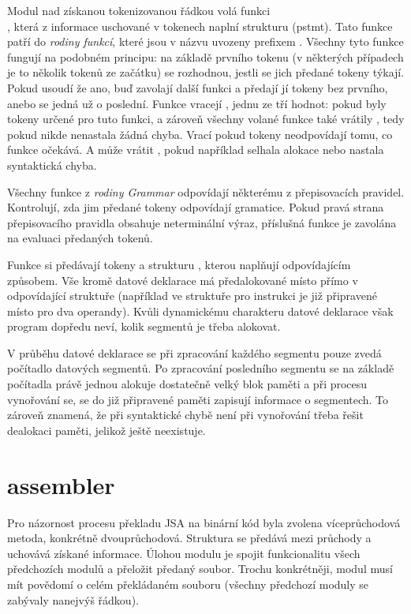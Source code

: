 \documentclass[czech, kiv, he, sem, pdf, viewonly]{fasthesis}
\begin{document}
Modul  nad získanou tokenizovanou řádkou volá funkci
\\, která z informace uschované v tokenech
naplní strukturu  (pstmt). Tato funkce patří do
\textit{rodiny funkcí}, které jsou v názvu uvozeny prefixem .
Všechny tyto funkce fungují na podobném principu: na základě prvního tokenu (v
některých případech je to několik tokenů ze začátku) se rozhodnou, jestli se
jich předané tokeny týkají. Pokud usoudí že ano, buď zavolají další funkci a
předají jí tokeny bez prvního, anebo se jedná už o poslední. Funkce vracejí
, jednu ze tří hodnot:  pokud byly tokeny
určené pro tuto funkci, a zároveň všechny volané funkce také vrátily
, tedy pokud nikde nenastala žádná chyba. Vrací
 pokud tokeny neodpovídají tomu, co funkce očekává. A může
vrátit , pokud například selhala alokace nebo nastala syntaktická
chyba.

Všechny funkce z \textit{rodiny Grammar} odpovídají některému z přepisovacích
pravidel. Kontrolují, zda jim předané tokeny odpovídají gramatice. Pokud pravá
strana přepisovacího pravidla obsahuje neterminální výraz, příslušná funkce je
zavolána na evaluaci předaných tokenů.

Funkce si předávají tokeny a strukturu , kterou
naplňují odpovídajícím způsobem. Vše kromě datové deklarace má předalokované
místo přímo v odpovídající struktuře (například ve struktuře pro instrukci je
již připravené místo pro dva operandy). Kvůli dynamickému charakteru datové
deklarace však program dopředu neví, kolik segmentů je třeba alokovat.

V průběhu datové deklarace se při zpracování každého segmentu pouze zvedá
počítadlo datových segmentů. Po zpracování posledního segmentu se na základě
počítadla právě jednou alokuje dostatečně velký blok paměti a při procesu
vynořování se, se do již připravené paměti zapisují informace o segmentech. To
zároveň znamená, že při syntaktické chybě není při vynořování třeba řešit
dealokaci paměti, jelikož ještě neexistuje.

\section{assembler}

Pro názornost procesu překladu JSA na binární kód byla zvolena víceprůchodová
metoda, konkrétně dvouprůchodová. Struktura  se
předává mezi průchody a uchovává získané informace. Úlohou modulu
 je spojit funkcionalitu všech předchozích modulů a přeložit
předaný soubor. Trochu konkrétněji, modul musí mít povědomí o celém překládaném
souboru (všechny předchozí moduly se zabývaly nanejvýš řádkou).
\end{document}
